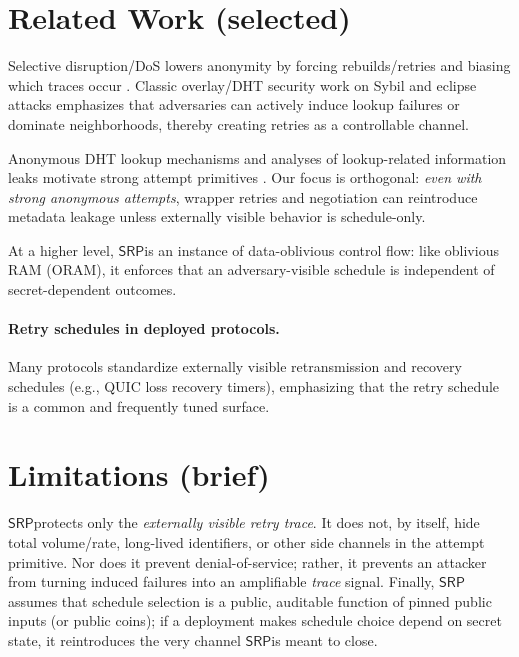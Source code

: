 \documentclass[11pt]{article}
\newcommand{\SRP}{\ensuremath{\mathsf{SRP}}}
\begin{document}
\section{Related Work (selected)}
Selective disruption/DoS lowers anonymity by forcing rebuilds/retries and biasing which traces occur
\cite{bauerLowResource2007,borisovDanezisMittalCCS2007,dasborisovSelectiveDoS2013,dannerDetectDoSTor2009,jansenPointBreak2019}.
Classic overlay/DHT security work on Sybil and eclipse attacks emphasizes that adversaries can actively induce lookup failures or dominate neighborhoods, thereby creating retries as a controllable channel.\cite{singhEclipseInfocom2006,baumgartSKademlia2007}

Anonymous DHT lookup mechanisms and analyses of lookup-related information leaks motivate strong attempt primitives
\cite{salsaNambiarSOSP2006,mittalInfoLeaksTISSEC2010,wangborisovLookupCCS2010,wangborisovOctopus2012}.
Our focus is orthogonal: \emph{even with strong anonymous attempts}, wrapper retries and negotiation can reintroduce metadata leakage unless externally visible behavior is schedule-only.

At a higher level, \SRP is an instance of data-oblivious control flow: like oblivious RAM (ORAM), it enforces that an adversary-visible schedule is independent of secret-dependent outcomes.\cite{goldreichOstrovskyORAM1996}

\paragraph{Retry schedules in deployed protocols.}
Many protocols standardize externally visible retransmission and recovery schedules (e.g., QUIC loss recovery timers),
emphasizing that the retry schedule is a common and frequently tuned surface.\cite{rfc9002}

\section{Limitations (brief)}
\label{sec:limitations}
\SRP protects only the \emph{externally visible retry trace}.
It does not, by itself, hide total volume/rate, long-lived identifiers, or other side channels in the attempt primitive.
Nor does it prevent denial-of-service; rather, it prevents an attacker from turning induced failures into an amplifiable \emph{trace} signal.
Finally, \SRP assumes that schedule selection is a public, auditable function of pinned public inputs (or public coins); if a deployment makes schedule choice depend on secret state, it reintroduces the very channel \SRP is meant to close.
\end{document}
